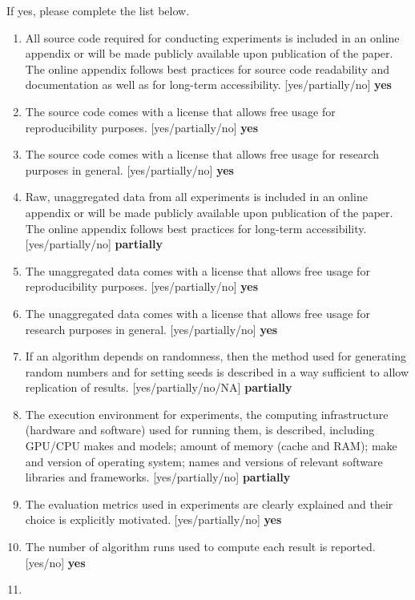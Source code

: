 If yes, please complete the list below.
\begin{enumerate}
    \item
    All source code required for conducting experiments is included in an online appendix
    or will be made publicly available upon publication of the paper.
    The online appendix follows best practices for source code readability and documentation as well as for long-term accessibility.
    [yes/partially/no] \textbf{yes}
    \item The source code comes with a license that
    allows free usage for reproducibility purposes.
    [yes/partially/no] \textbf{yes}
    \item The source code comes with a license that
    allows free usage for research purposes in general.
    [yes/partially/no] \textbf{yes}
    \item
    Raw, unaggregated data from all experiments is included in an online appendix
    or will be made publicly available upon publication of the paper.
    The online appendix follows best practices for long-term accessibility.
    [yes/partially/no] \textbf{partially}
    \item The unaggregated data comes with a license that
    allows free usage for reproducibility purposes.
    [yes/partially/no] \textbf{yes}
    \item The unaggregated data comes with a license that
    allows free usage for research purposes in general.
    [yes/partially/no] \textbf{yes}
    \item If an algorithm depends on randomness, then the method used for generating random numbers and for setting seeds is described in a way sufficient to allow replication of results.
    [yes/partially/no/NA] \textbf{partially}
    \item The execution environment for experiments, the computing infrastructure (hardware and software) used for running them, is described, including GPU/CPU makes and models; amount of memory (cache and RAM); make and version of operating system; names and versions of relevant software libraries and frameworks.
    [yes/partially/no] \textbf{partially}
    \item
    The evaluation metrics used in experiments are clearly explained and their choice is explicitly motivated.
    [yes/partially/no] \textbf{yes}
    \item
    The number of algorithm runs used to compute each result is reported.
    [yes/no] \textbf{yes}
    \item

\end{enumerate}
